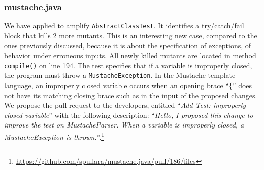 \subsubsection{mustache.java}


We have applied \dspot to amplify \texttt{AbstractClassTest}. It identifies a try/catch/fail block that kills 2 more mutants.
This is an interesting new case, compared to the ones previously discussed, because it is about the specification of exceptions, \ie of behavior under erroneous inputs.
All newly killed mutants are located in method \texttt{compile()} on line 194. The test specifies that if a variable is improperly closed, the program must throw a \texttt{MustacheException}. In the Mustache template language, an improperly closed variable occurs when an opening brace ``$\{$'' does not have its matching closing brace such as in the input of the proposed changes. We propose the pull request to the developers, entitled ``\emph{Add Test: improperly closed variable}'' with the following description: ``\emph{Hello, I proposed this change to improve the test on MustacheParser. When a variable is improperly closed, a MustacheException is thrown.}''.\footnote{\url{https://github.com/spullara/mustache.java/pull/186/files}}
